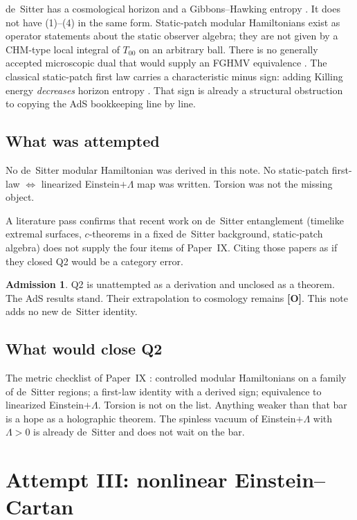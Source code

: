 \documentclass[11pt]{article}
\theoremstyle{definition}
\newtheorem*{admission}{Admission}
\newcommand{\pO}{\textbf{[O]}}
\begin{document}
de~Sitter has a cosmological horizon and a Gibbons--Hawking entropy
\cite{GH1977}. It does not have (1)--(4) in the same form. Static-patch
modular Hamiltonians exist as operator statements about the static
observer algebra; they are not given by a CHM-type local integral of
$T_{00}$ on an arbitrary ball. There is no generally accepted
microscopic dual that would supply an FGHMV equivalence
\cite{Strominger2001}. The classical static-patch first law carries a
characteristic minus sign: adding Killing energy \emph{decreases}
horizon entropy \cite{Banihashemi2022}. That sign is already a
structural obstruction to copying the AdS bookkeeping line by line.

\subsection{What was attempted}

No de~Sitter modular Hamiltonian was derived in this note. No
static-patch first-law $\Leftrightarrow$ linearized Einstein$+\Lambda$
map was written. Torsion was not the missing object.

A literature pass confirms that recent work on de~Sitter entanglement
(timelike extremal surfaces, $c$-theorems in a fixed de~Sitter
background, static-patch algebra) does not supply the four items of
Paper~IX. Citing those papers as if they closed Q2 would be a
category error.

\begin{admission}
Q2 is unattempted as a derivation and unclosed as a theorem. The
AdS results stand. Their extrapolation to cosmology remains \pO{}.
This note adds no new de~Sitter identity.
\end{admission}

\subsection{What would close Q2}

The metric checklist of Paper~IX \cite{McGwierIX}: controlled modular
Hamiltonians on a family of de~Sitter regions; a first-law identity
with a derived sign; equivalence to linearized Einstein$+\Lambda$.
Torsion is not on the list. Anything weaker than that bar is a hope
as a holographic theorem. The spinless vacuum of Einstein$+\Lambda$
with $\Lambda>0$ is already de~Sitter and does not wait on the bar.

\section{Attempt III: nonlinear Einstein--Cartan}
\label{sec:nl}
\end{document}
